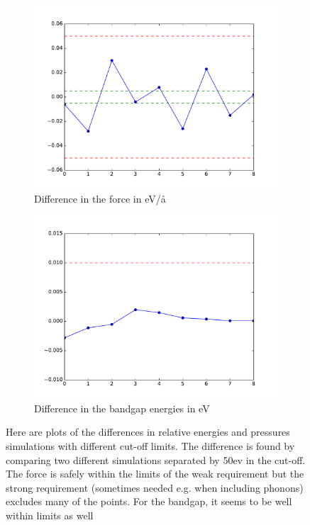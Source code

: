 \documentclass[a4paper,10pt]{article}
\begin{document}
	  \begin{figure}[h]
		\begin{center}
			\begin{subfigure}{0.4\textwidth}
				\includegraphics[width=1.0\linewidth]{forceDiff.pdf} 
				\caption{Difference in the force in eV/å}
				\label{fig:subim1}
			\end{subfigure}
			\begin{subfigure}{0.4\textwidth}
				\includegraphics[width=1.0\linewidth]{bandgapDiff.pdf}
				\caption{Difference in the bandgap energies in eV}
				\label{fig:subim2}
			\end{subfigure}
			
			\caption{Here are plots of the differences in relative energies and pressures simulations with different cut-off limits. The difference is found by comparing two different simulations separated by 50ev in the cut-off. The force is safely within the limits of the weak requirement but the strong requirement (sometimes needed e.g. when including phonons) excludes many of the points. For the bandgap, it seems to be well within limits as well}
			\label{fig:image2}
		\end{center}
	\end{figure}
	\newpage
\end{document}
